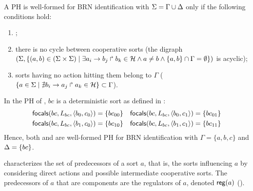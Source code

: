 \begin{property}\label{pro:wf-ph}
A PH is well-formed for BRN identification with
$\Sigma = \Gamma\cup\Delta$ only if the following conditions hold:
\begin{enumerate}
\item 
{};
\item 
there is no cycle between cooperative sorts
(the digraph $(\Sigma,\{(a,b)\in(\Sigma\times\Sigma)\mid \exists a_i\rightarrow b_j\Rsh b_k\in\mathcal{H}
\wedge a\neq b\wedge \{a,b\}\cap\Gamma=\emptyset \})$ is
acyclic);
\item 
sorts having no action hitting them belong to $\Gamma$
($\{ a \in \Sigma\mid \nexists b_i\rightarrow a_j\Rsh a_k\in\mathcal{H}\} \subset \Gamma$).
\end{enumerate}
\end{property}

\begin{example}
In the PH of , $bc$ is a deterministic sort as defined in
:
\begin{align*}
\mathsf{focals}(bc, L_{bc}, \langle b_0, c_0 \rangle) = \{bc_{00}\} &&
\mathsf{focals}(bc, L_{bc}, \langle b_0, c_1 \rangle) = \{bc_{01}\} \\
\mathsf{focals}(bc, L_{bc}, \langle b_1, c_0 \rangle) = \{bc_{10}\} && 
\mathsf{focals}(bc, L_{bc}, \langle b_1, c_1 \rangle) = \{bc_{11}\}
\end{align*}
Hence, both  and  are well-formed PH
for BRN identification with $\Gamma = \{a,b,c\}$ and $\Delta=\{bc\}$.
\end{example}

 characterizes the set of predecessors of a sort $a$, that is, the sorts influencing $a$
by considering direct actions and possible intermediate cooperative sorts.
The predecessors of $a$ that are components are the regulators of $a$, denoted $\mathsf{reg}({a})$
().

